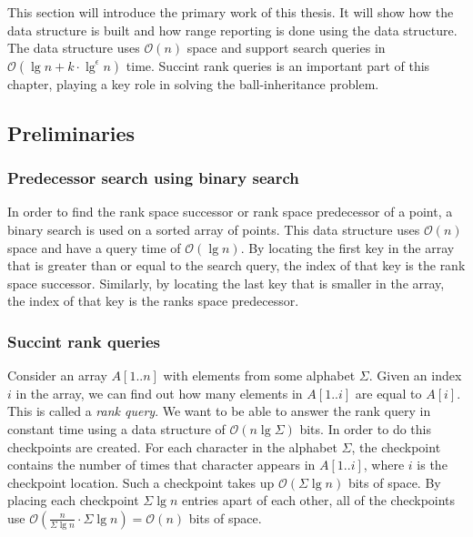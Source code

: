 This section will introduce the primary work of this thesis. It will show how the data structure is built and how range reporting is done using the data structure. The data structure uses $\mathcal{O}(n)$ space and support search queries in $\mathcal{O}(\lg n + k\cdot \lg^\epsilon n)$ time. Succint rank queries is an important part of this chapter, playing a key role in solving the ball-inheritance problem. 


\subsection{Preliminaries}

\subsubsection{Predecessor search using binary search}
In order to find the rank space successor or rank space predecessor of a point, a binary search is used on a sorted array of points. This data structure uses $\mathcal{O}(n)$ space and have a query time of $\mathcal{O}(\lg n)$. By locating the first key in the array that is greater than or equal to the search query, the index of that key is the rank space successor. Similarly, by locating the last key that is smaller in the array, the index of that key is the ranks space predecessor.

\subsubsection{Succint rank queries}
Consider an array $A[1..n]$ with elements from some alphabet $\Sigma$. Given an index $i$ in the array, we can find out how many elements in $A[1..i]$ are equal to $A[i]$. This is called a \emph{rank query}. We want to be able to answer the rank query in constant time using a data structure of $\mathcal{O}(n \lg \Sigma)$ bits. In order to do this checkpoints are created. For each character in the alphabet $\Sigma$, the checkpoint contains the number of times that character appears in $A[1..i]$, where $i$ is the checkpoint location. Such a checkpoint takes up $\mathcal{O}(\Sigma \lg n)$ bits of space. By placing each checkpoint $\Sigma \lg n$ entries apart of each other, all of the checkpoints use $\mathcal{O}(\frac{n}{\Sigma \lg n} \cdot \Sigma \lg n) = \mathcal{O}(n)$ bits of space.

